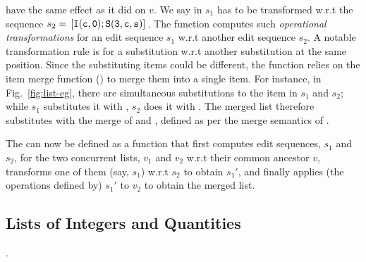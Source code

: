 \begin{itemize}
    have the same effect as it did on $v$. We say  in $s_1$
    has to be transformed w.r.t the sequence $s_2 =
    \,{\tt [I(c,0);S(3,c,s)]}\,$.  The function  computes
    such \emph{operational transformations} for an edit sequence $s_1$
    w.r.t another edit sequence $s_2$. A notable transformation rule
    is for a substitution w.r.t another substitution at the same
    position. Since the substituting items could be different, the
    function relies on the item merge function () to merge
    them into a single item. For instance, in Fig.~\ref{fig:list-eg},
    there are simultaneous substitutions to the item  in $s_1$
    and $s_2$; while $s_1$ substitutes it with , $s_2$ does it
    with . The merged list therefore substitutes  with the
    merge of  and , defined as per the merge semantics of
    .
\end{itemize}
The  can now be defined as a function that first
computes edit sequences, $s_1$ and $s_2$, for the two concurrent
lists, $v_1$ and $v_2$ w.r.t their common ancestor $v$, transforms one
of them (say, $s_1$) w.r.t $s_2$ to obtain $s_1'$, and finally applies
(the operations defined by) $s_1'$ to $v_2$ to obtain the merged list.

\subsection{Lists of Integers and Quantities}.

